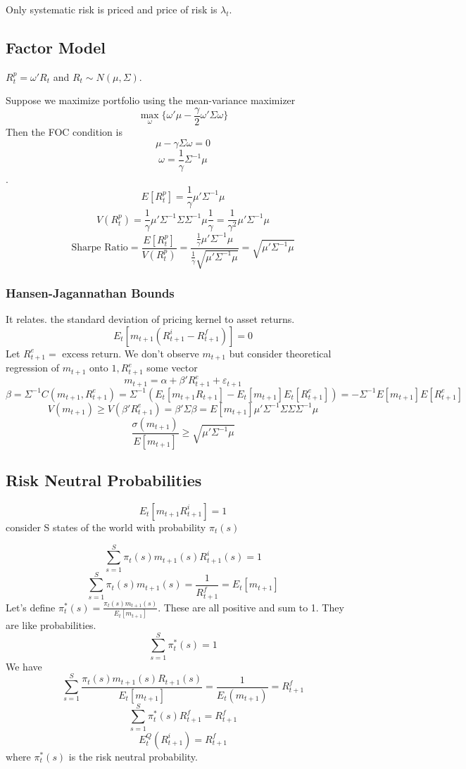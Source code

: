 \documentclass[11pt, a4paper, oneside]{article}
\theoremstyle{definition}
\theoremstyle{proposition}
\theoremstyle{corollary}
\theoremstyle{lemma}
\theoremstyle{theorem}
\begin{document}
Only systematic risk is priced and price of risk is $\lambda_t$. 

\subsection{Factor Model}
$R_t^p = \omega'R_t$ and $R_t \sim N(\mu, \Sigma)$. 

Suppose we maximize portfolio using the mean-variance maximizer
$$\max_{\omega} \{\omega'\mu - \frac{\gamma}{2}\omega' \Sigma\omega\}$$
Then the FOC condition is
$$\mu - \gamma\Sigma \omega = 0$$
$$\omega = \frac{1}{\gamma}\Sigma^{-1}\mu$$. 
$$E[R_t^p] = \frac{1}{\gamma} \mu' \Sigma^{-1}\mu$$
$$V(R_t^p) = \frac{1}{\gamma} \mu'\Sigma^{-1}\Sigma\Sigma^{-1}\mu\frac{1}{\gamma} = \frac{1}{\gamma^2} \mu'\Sigma^{-1}\mu$$
$$\text{Sharpe Ratio} = \frac{E[R_t^p]}{V(R_t^p)} = \frac{\frac{1}{\gamma} \mu' \Sigma^{-1}\mu}{\frac{1}{\gamma}\sqrt{\mu'\Sigma^{-1}\mu}} = \sqrt{\mu' \Sigma^{-1}\mu}$$

\subsubsection{Hansen-Jagannathan Bounds}
It relates. the standard deviation of pricing kernel to asset returns. 
$$E_t[m_{t+1}(R_{t+1}^i - R_{t+1}^f)] = 0$$
Let $R_{t+1}^e = \text{ excess return}$. We don't observe $m_{t+1}$ but consider theoretical regression of $m_{t+1}$ onto $1, R_{t +1}^e$ some vector 
$$m_{t+1} = \alpha + \beta'R_{t+1}^e + \varepsilon_{t+1}$$
$$\beta = \Sigma^{-1}C(m_{t+1}, R_{t+1}^e) = \Sigma^{-1}(E_t[m_{t+1}R_{t+1}] - E_t[m_{t+1}]E_t[R_{t+1}^e])=-\Sigma^{-1}E[m_{t+1}]E[R_{t+1}^e]$$ 
$$V(m_{t+1}) \geq V(\beta'R_{t+1}^e) = \beta'\Sigma\beta = E[m_{t+1}]\mu'\Sigma^{-1}\Sigma\Sigma\Sigma^{-1}\mu$$
$$\frac{\sigma(m_{t+1})}{E[m_{t+1}]} \geq \sqrt{\mu' \Sigma^{-1}\mu}$$

\subsection{Risk Neutral Probabilities}
$$E_t[m_{t+1}R_{t+1}^i] = 1$$ consider S states of the world with probability $\pi_t(s)$

$$\sum_{s = 1}^S \pi_t(s) m_{t+1}(s) R_{t+1}^i(s) = 1$$ 
$$\sum_{s= 1}^S\pi_t(s) m_{t+1}(s) = \frac{1}{R_{t+1}^f} = E_t[m_{t+1}]$$
Let's define $\pi_t^*(s) = \frac{\pi_t(s) m_{t+1}(s)}{E_t[m_{t+1}]}$. These are all positive and sum to 1. They are like probabilities.
$$\sum_{s= 1}^S\pi^*_t(s) = 1$$
We have $$\sum_{s=1}^S \frac{\pi_t(s) m_{t+1}(s)R_{t+1}(s)}{E_t[m_{t+1}]} = \frac{1}{E_t(m_{t+1})} = R_{t+1}^f$$
$$\sum_{s= 1}^S \pi_t^*(s) R_{t+1}^f = R_{t+1}^f$$
$$E_t^Q(R_{t+1}^i) = R_{t+1}^f$$ where $\pi^*_t(s)$ is the risk neutral probability. 
\end{document}
